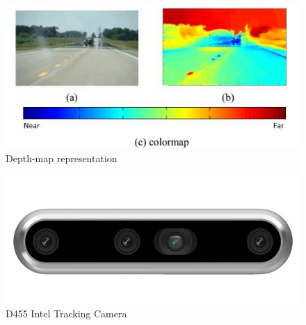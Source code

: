 \begin{figure}[H]
    \centering
    \includegraphics[scale=0.6]{Images/Chapter 3/depthmap.png}
    \caption{Depth-map representation}
    \label{fig:depthmap}
\end{figure}

\begin{figure}[H]
    \centering
    \includegraphics[scale = 0.5]{Images/Chapter 3/inteld455.jpeg}
    \caption{D455 Intel Tracking Camera }
    \label{fig:d455}
\end{figure}

